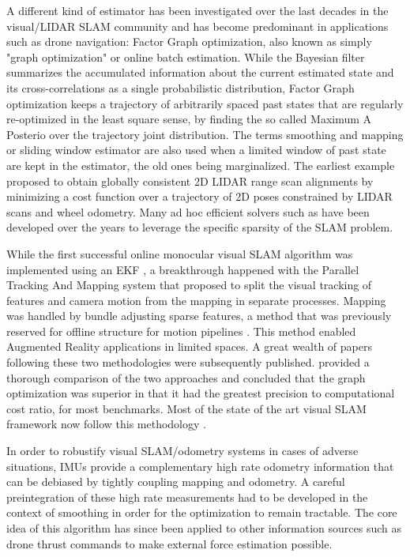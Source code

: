 A different kind of estimator has been investigated over the last decades in the visual/LIDAR SLAM community and has become predominant in applications
such as drone navigation: Factor Graph optimization, also known as simply "graph optimization" or online batch estimation. While the Bayesian filter summarizes 
the accumulated information about the current estimated state and its cross-correlations as a single probabilistic distribution, 
Factor Graph optimization keeps a trajectory of arbitrarily spaced past states that are regularly re-optimized in the least square sense, by finding the so called 
Maximum A Posterio over the trajectory joint distribution. The terms smoothing and mapping or sliding window estimator are also used when a limited window of past state are kept 
in the estimator, the old ones being marginalized. The earliest example \cite{lu1997globally} proposed to obtain globally consistent 2D LIDAR range 
scan alignments by minimizing a cost function over a trajectory of 2D poses constrained by LIDAR scans and wheel odometry.
 Many ad hoc efficient solvers such as \cite{grisetti2011g2o, dellaert2012factor, ila2017slam++, ceres-solver} have been developed 
over the years to leverage the specific sparsity of the SLAM problem.

While the first successful online monocular visual SLAM algorithm was implemented using an EKF \cite{davison2007monoslam}, a breakthrough happened with the 
Parallel Tracking And Mapping system \cite{klein2009parallel} that proposed to split the visual tracking of features and camera motion from the 
mapping in separate processes. Mapping was handled by bundle adjusting sparse features, a method that was previously reserved for offline 
structure for motion pipelines \cite{triggs1999bundle}. This method enabled Augmented Reality applications in limited spaces. 
A great wealth of papers following these two methodologies were subsequently published. \cite{strasdat2012visual} provided a thorough comparison 
of the two approaches and concluded that the graph optimization was superior in that it had the greatest precision to 
computational cost ratio, for most benchmarks. Most of the state of the art visual SLAM framework now follow this methodology 
\cite{forster2017-TRO, mur2015orb, qin2018vins, leutenegger2015keyframe, ferrera2021ov}.

In order to robustify visual SLAM/odometry systems in cases of adverse situations, IMUs provide a complementary high rate odometry information that can 
be debiased by tightly coupling mapping and odometry. A careful preintegration \cite{lupton-09,forster2017-TRO} of these high 
rate measurements had to be developed in the context of smoothing in order for the optimization to remain tractable. The core idea of this algorithm has 
since been applied to other information sources such as drone thrust commands \cite{nisar2019vimo} to make external force estimation possible.

